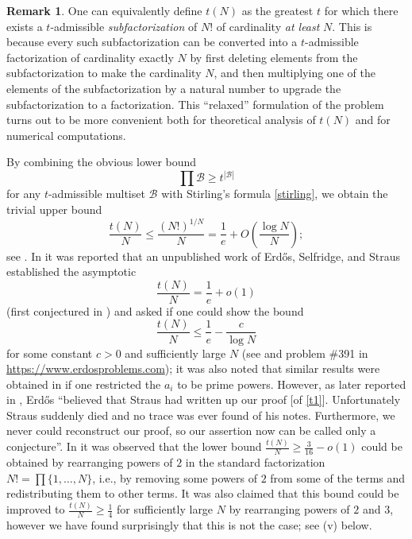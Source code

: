 \documentclass[10pt,a4paper,reqno]{amsart}
\numberwithin{equation}{section}
\theoremstyle{plain}
\theoremstyle{definition}
\newtheorem{remark}[theorem]{Remark}
\newcommand\tuple{{\mathcal B}}
\begin{document}
\begin{remark}\label{subfac}  One can equivalently define $t(N)$ as the greatest $t$ for which there exists a $t$-admissible \emph{subfactorization} of $N!$ of cardinality \emph{at least} $N$.  This is because every such subfactorization can be converted into a $t$-admissible factorization of cardinality exactly $N$ by first deleting elements from the subfactorization to make the cardinality $N$, and then multiplying one of the elements of the subfactorization by a natural number to upgrade the subfactorization to a factorization.  This ``relaxed'' formulation of the problem turns out to be more convenient both for theoretical analysis of $t(N)$ and for numerical computations.
\end{remark}

By combining the obvious lower bound
\begin{equation}\label{obvious}
 \prod \tuple \geq t^{|\tuple|}
\end{equation}
for any $t$-admissible multiset $\tuple$ with Stirling's formula \eqref{stirling}, we obtain the trivial upper bound
\begin{equation}\label{trivial} \frac{t(N)}{N} \leq \frac{(N!)^{1/N}}{N} = \frac{1}{e} + O\left( \frac{\log N}{N}\right);
\end{equation}
see .  In \cite[p.75]{erdos-graham} it was reported that an unpublished work of Erd\H{o}s, Selfridge, and Straus established the asymptotic
\begin{equation}\label{t1}
  \frac{t(N)}{N} = \frac{1}{e} + o(1)
\end{equation}
(first conjectured in \cite{erdos-71}) and asked if one could show the bound
\begin{equation}\label{Tbound}
   \frac{t(N)}{N} \leq \frac{1}{e} - \frac{c}{\log N}
\end{equation}
for some constant $c>0$ and sufficiently large $N$ (see \cite[Section B22, p.\ 122--123]{guy} and problem {\#}391 in \url{https://www.erdosproblems.com}); it was also noted that similar results were obtained in \cite{algr77} if one restricted the $a_i$ to be prime powers.  However, as later reported in \cite{erdos-96}, Erd\H{o}s ``believed that Straus had written up our proof [of \eqref{t1}]. Unfortunately Straus suddenly died and no trace was ever found of his notes. Furthermore, we never could reconstruct our proof, so our assertion now can be called only a conjecture''.   In \cite{guy-selfridge} it was observed that the lower bound $\frac{t(N)}{N} \geq \frac{3}{16}-o(1)$ could be obtained by rearranging powers of $2$ in the standard factorization $N! = \prod \{1,\dots,N\}$, i.e., by removing some powers of $2$ from some of the terms and redistributing them to other terms.  It was also claimed that this bound could be improved to $\frac{t(N)}{N} \geq \frac{1}{4}$ for sufficiently large $N$ by rearranging powers of $2$ and $3$, however we have found surprisingly that this is not the case; see (v) below.
\end{document}
